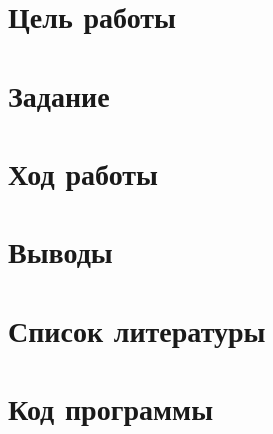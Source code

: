 


	
	\tableofcontents
 	\setcounter{page}{2}
	\newpage
	\section*{Цель работы}
	
	\section*{Задание}
	
	\newpage
	\section*{Ход работы}
	
	\newpage
	\section*{Выводы}
	
	\newpage
	\section*{Список литературы}
	
	\newpage
	\section*{Код программы}
	

